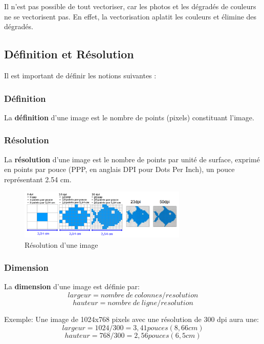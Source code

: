 \documentclass[11pt, a4paper]{book}
\begin{document}
\begin{remarque}

Il n’est pas possible de tout vectoriser, car les photos et les dégradés de couleurs ne se vectorisent pas. En effet, la vectorisation aplatit les couleurs et élimine des dégradés.

\end{remarque}

\subsection{Définition et Résolution}
Il est important de définir les notions suivantes : 
\subsubsection{Définition}
 La \textbf{définition} d'une image est le nombre de points (pixels) constituant l’image.
 
\subsubsection{Résolution}
 La \textbf{résolution} d'une image est le nombre de points par unité de surface, exprimé en points par pouce (PPP, en anglais DPI pour Dots Per Inch), un pouce représentant 2.54 cm.

\begin{center}
\begin{figure} [h!]
\centering
\includegraphics[width=8cm]{images/dpi_poisson.png}
\caption{Résolution d'une image}
\end{figure}
\end{center}

\subsubsection{Dimension}
La \textbf{dimension} d’une image est définie par:
$$largeur = nombre\ de\ colonnes / resolution$$
$$hauteur = nombre\ de\ ligne / resolution$$

Exemple: Une image de 1024x768 pixels avec une résolution de 300 dpi aura une:
$$largeur = 1024 / 300 = 3,41 pouces (8,66 cm)$$
$$hauteur = 768 / 300 = 2,56 pouces (6,5 cm)$$
\end{document}
